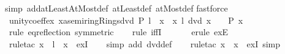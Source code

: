 \begin{isabellebody}
{\isacharparenleft}{\kern0pt}simp\ add{\isacharcolon}{\kern0pt}atLeastAtMost{\isacharunderscore}{\kern0pt}def\ atLeast{\isacharunderscore}{\kern0pt}def\ atMost{\isacharunderscore}{\kern0pt}def{\isacharparenright}{\kern0pt}\isanewline
{}\isamarkupfalse%
{\isacharparenleft}{\kern0pt}fastforce{\isacharparenright}{\kern0pt}\isanewline
{}\isamarkupfalse%
%
\endisatagproof
{\isafoldproof}%
%
\isadelimproof
\isanewline
%
\endisadelimproof
\isanewline
{}\isamarkupfalse%
\ unity{\isacharunderscore}{\kern0pt}coeff{\isacharunderscore}{\kern0pt}ex{\isacharcolon}{\kern0pt}\ {\isachardoublequoteopen}{\isacharparenleft}{\kern0pt}{\isasymexists}{\isacharparenleft}{\kern0pt}x{\isacharcolon}{\kern0pt}{\isacharcolon}{\kern0pt}{\isacharprime}{\kern0pt}a{\isacharcolon}{\kern0pt}{\isacharcolon}{\kern0pt}{\isacharbraceleft}{\kern0pt}semiring{\isacharunderscore}{\kern0pt}{}{\isacharcomma}{\kern0pt}Rings{\isachardot}{\kern0pt}dvd{\isacharbraceright}{\kern0pt}{\isacharparenright}{\kern0pt}{\isachardot}{\kern0pt}\ P\ {\isacharparenleft}{\kern0pt}l\ {\isacharasterisk}{\kern0pt}\ x{\isacharparenright}{\kern0pt}{\isacharparenright}{\kern0pt}\ {\isasymequiv}\ {\isacharparenleft}{\kern0pt}{\isasymexists}x{\isachardot}{\kern0pt}\ l\ dvd\ {\isacharparenleft}{\kern0pt}x\ {\isacharplus}{\kern0pt}\ {}{\isacharparenright}{\kern0pt}\ {\isasymand}\ P\ x{\isacharparenright}{\kern0pt}{\isachardoublequoteclose}\isanewline
%
\isadelimproof
\ \ %
\endisadelimproof
%
\isatagproof
{}\isamarkupfalse%
\ {\isacharparenleft}{\kern0pt}rule\ eq{\isacharunderscore}{\kern0pt}reflection\ {\isacharbrackleft}{\kern0pt}symmetric{\isacharbrackright}{\kern0pt}{\isacharparenright}{\kern0pt}\isanewline
\ \ \isamarkupfalse%
\ {\isacharparenleft}{\kern0pt}rule\ iffI{\isacharparenright}{\kern0pt}\isanewline
\ \ \isamarkupfalse%
\isanewline
\ \ \isamarkupfalse%
\ {\isacharparenleft}{\kern0pt}erule\ exE{\isacharparenright}{\kern0pt}\isanewline
\ \ \isamarkupfalse%
\ {\isacharparenleft}{\kern0pt}rule{\isacharunderscore}{\kern0pt}tac\ x\ {\isacharequal}{\kern0pt}\ {\isachardoublequoteopen}l\ {\isacharasterisk}{\kern0pt}\ x{\isachardoublequoteclose}\ \ exI{\isacharparenright}{\kern0pt}\isanewline
\ \ \isamarkupfalse%
\ {\isacharparenleft}{\kern0pt}simp\ add{\isacharcolon}{\kern0pt}\ dvd{\isacharunderscore}{\kern0pt}def{\isacharparenright}{\kern0pt}\isanewline
\ \ \isamarkupfalse%
\ {\isacharparenleft}{\kern0pt}rule{\isacharunderscore}{\kern0pt}tac\ x\ {\isacharequal}{\kern0pt}\ x\ \ exI{\isacharcomma}{\kern0pt}\ simp{\isacharparenright}{\kern0pt}\isanewline

\end{isabellebody}
